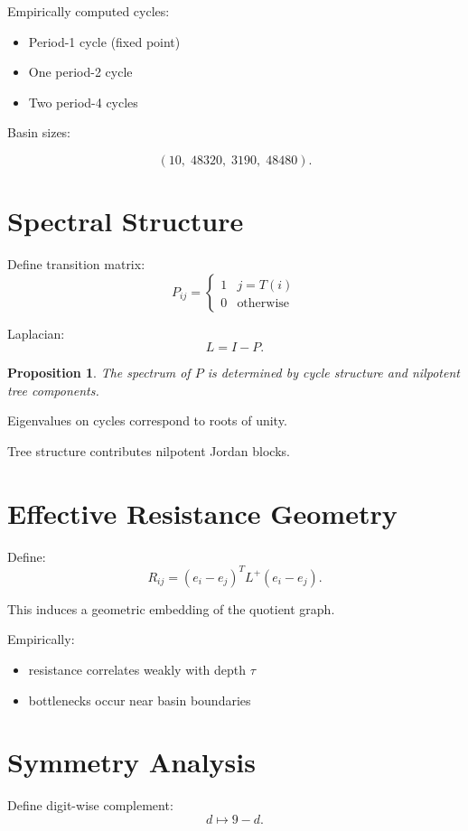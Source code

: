 \documentclass[11pt]{article}
\newtheorem{proposition}{Proposition}
\begin{document}
Empirically computed cycles:

\begin{itemize}
\item Period-1 cycle (fixed point)
\item One period-2 cycle
\item Two period-4 cycles
\end{itemize}

Basin sizes:

\[
(10,\; 48320,\; 3190,\; 48480).
\]

\section{Spectral Structure}

Define transition matrix:
\[
P_{ij} =
\begin{cases}
1 & j = T(i) \\
0 & \text{otherwise}
\end{cases}
\]

Laplacian:
\[
L = I - P.
\]

\begin{proposition}
The spectrum of $P$ is determined by cycle structure and nilpotent tree components.
\end{proposition}

Eigenvalues on cycles correspond to roots of unity.

Tree structure contributes nilpotent Jordan blocks.

\section{Effective Resistance Geometry}

Define:
\[
R_{ij} = (e_i - e_j)^T L^+ (e_i - e_j).
\]

This induces a geometric embedding of the quotient graph.

Empirically:
\begin{itemize}
\item resistance correlates weakly with depth $\tau$
\item bottlenecks occur near basin boundaries
\end{itemize}

\section{Symmetry Analysis}

Define digit-wise complement:
\[
d \mapsto 9 - d.
\]
\end{document}
